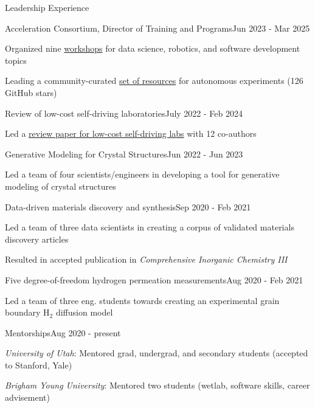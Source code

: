 \documentclass{resume} %
\begin{document}
\begin{rSection}{Leadership Experience}
\begin{rSubsection}{Acceleration Consortium, Director of Training and Programs}{Jun 2023 - Mar 2025}{}
\item Organized nine \href{https://youtu.be/IVaWl2tL06c?si=DYrhZP6uvK5srQ58}{workshops} for data science, robotics, and software development topics
\item Leading a community-curated \href{https://github.com/AccelerationConsortium/awesome-self-driving-labs}{set of resources} for autonomous experiments (126 GitHub stars)
\end{rSubsection}
\begin{rSubsection}{Review of low-cost self-driving laboratories}{July 2022 - Feb 2024}{} \NLS
\item Led a \href{https://doi.org/10.1039/D3DD00223C}{review paper for low-cost self-driving labs} with 12 co-authors
\end{rSubsection}
\begin{rSubsection}{Generative Modeling for Crystal Structures}{Jun 2022 - Jun 2023}{} \\
\item Led a team of four scientists/engineers in developing a tool for generative modeling of crystal structures
\end{rSubsection}
\begin{rSubsection}{Data-driven materials discovery and synthesis}{Sep 2020 - Feb 2021}{} \NLS
\item Led a team of three data scientists in creating a corpus of validated materials discovery articles
\item Resulted in accepted publication in \textit{Comprehensive Inorganic Chemistry III}
\end{rSubsection}
\begin{rSubsection}{Five degree-of-freedom hydrogen permeation measurements}{Aug 2020 - Feb 2021}{} \\
\item Led a team of three eng. students towards creating an experimental grain boundary $\mathrm{H}_2$ diffusion model
\end{rSubsection}
\begin{rSubsection}{Mentorships}{Aug 2020 - present}{} \\
\item \textit{University of Utah}: Mentored grad, undergrad, and secondary students (accepted to Stanford, Yale) \smallskip
\item \textit{Brigham Young University}: Mentored two students (wetlab, software skills, career advisement)
\end{rSubsection}
\end{rSection}
\end{document}
